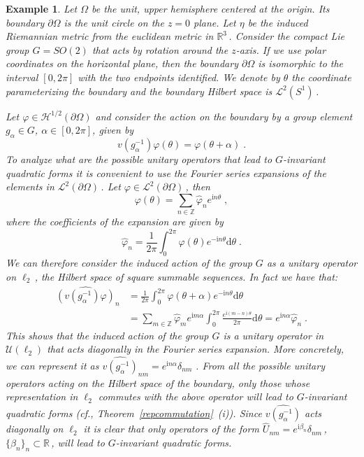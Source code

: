 \documentclass[a4paper,12pt]{amsart}
\renewcommand{\H}{\mathcal{H}}
\renewcommand{\L}{\mathcal{L}}
\renewcommand{\d}{\mathrm{d}}
\newcommand{\pO}{{\partial \Omega}}
\newcommand{\1}{\mathbb{I}}
\newtheorem{example}[theorem]{Example}
\numberwithin{equation}{section}
\numberwithin{theorem}{section}
\begin{document}
\begin{example}\label{ex:upperhemisphere}
Let $\Omega$ be the unit, upper hemisphere centered at the origin. 
Its boundary $\pO$ is the unit circle on the $z=0$ plane. 
Let $\eta$ be the induced Riemannian metric from the euclidean metric in $\mathbb{R}^3$\,. Consider the compact Lie group 
$G=SO(2)$ that acts by rotation around the $z$-axis. 
If we use polar coordinates on the horizontal plane, then the boundary $\pO$ is isomorphic to the interval $[0,2\pi]$ with 
the two endpoints identified. 
We denote by $\theta$ the coordinate parameterizing the boundary and the boundary Hilbert space is $\L^2(S^1)$\,.

Let $\varphi\in\H^{1/2}(\pO)$ and consider the action on the boundary by a group element 
$g_\alpha\in G$, $\alpha\in [0,2\pi]$, given by
$$v (g^{-1}_\alpha)\varphi(\theta)=\varphi(\theta+\alpha)\;.$$
To analyze what are the possible unitary operators that lead to $G$-invariant quadratic forms it is convenient to use the Fourier 
series expansions of the elements in $\L^2(\pO)$\,. Let $\varphi\in\L^2(\pO)$\,, then
$$\varphi(\theta)=\sum_{n\in\mathbb{Z}}\hat{\varphi}_ne^{\mathrm{i}n\theta}\;,$$
where the coefficients of the expansion are given by $$\hat{\varphi}_n=\frac{1}{2\pi}\int_0^{2\pi}\varphi(\theta)e^{-\mathrm{i}n\theta}\d\theta\;.$$
We can therefore consider the induced action of the group $G$ as a unitary operator on ${\ell}_2$\,, the Hilbert space of square summable sequences. 
In fact we have that:
\begin{align*}
\widehat{(v (g^{-1}_\alpha)\varphi)}_n&
=\frac{1}{2\pi}\int_0^{2\pi}\varphi(\theta+\alpha)e^{-\mathrm{i}n\theta}\d\theta\\
&=\sum_{m\in\mathbb{Z}}\hat{\varphi}_me^{\mathrm{i}m\alpha}\int_0^{2\pi}\frac{e^{\mathrm{i}(m-n)\theta}}{2\pi}\d\theta
 =e^{\mathrm{i}n\alpha}\hat{\varphi}_n\;.
\end{align*}
This shows that the induced action of the group $G$ is a unitary operator in $\mathcal{U}(\ell_2)$ that acts 
diagonally in the Fourier series expansion.
More concretely, we can represent it as $\widehat{v (g^{-1}_\alpha)}_{nm}=e^{\mathrm{i}n\alpha}\delta_{nm}\,$\,.
From all the possible unitary operators acting on the Hilbert space of the boundary, only those whose representation in $\ell_2$
commutes with the above operator will lead to $G$-invariant quadratic forms (cf., Theorem~\ref{repcommutation}~(i)). 
Since $\widehat{v (g^{-1}_\alpha)}$ acts
diagonally on $\ell_2$ it is clear that only operators of the form $\hat{U}_{nm}=e^{\mathrm{i}\beta_n}\delta_{nm}$\,, 
$\{\beta_n\}_n\subset\mathbb{R}$\,, will lead to $G$-invariant quadratic forms.


\end{example}
\end{document}
